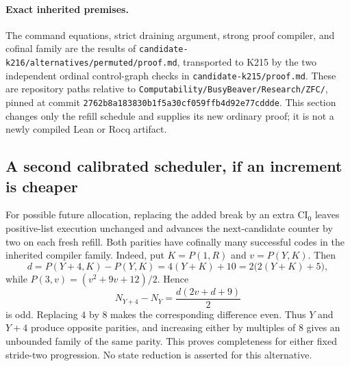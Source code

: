\paragraph{Exact inherited premises.}
The command equations, strict draining argument, strong proof compiler,
and cofinal family are the results of
\texttt{candidate-k216/alternatives/permuted/proof.md}, transported to
K215 by the two independent ordinal control-graph checks in
\texttt{candidate-k215/proof.md}. These are repository paths relative to
\texttt{Computability/BusyBeaver/Research/ZFC/}, pinned at commit
\texttt{2762b8a183830b1f5a30cf059ffb4d92e77cddde}. This section changes
only the refill schedule and supplies its new ordinary proof; it is not
a newly compiled Lean or Rocq artifact.

\subsection{A second calibrated scheduler, if an increment is cheaper}

For possible future allocation, replacing the added break by an extra
$\mathrm{CI}_0$ leaves positive-list execution unchanged and advances the
next-candidate counter by two on each fresh refill. Both parities have
cofinally many successful codes in the inherited compiler family.
Indeed, put $K=P(1,R)$ and $v=P(Y,K)$. Then
\[
 d=P(Y+4,K)-P(Y,K)=4(Y+K)+10=2\bigl(2(Y+K)+5\bigr),
\]
while $P(3,v)=(v^2+9v+12)/2$. Hence
\[
 N_{Y+4}-N_Y=\frac{d(2v+d+9)}2
\]
is odd. Replacing $4$ by $8$ makes the corresponding difference even.
Thus $Y$ and $Y+4$ produce opposite parities, and increasing either by
multiples of $8$ gives an unbounded family of the same parity. This proves
completeness for either fixed stride-two progression. No state reduction
is asserted for this alternative.
